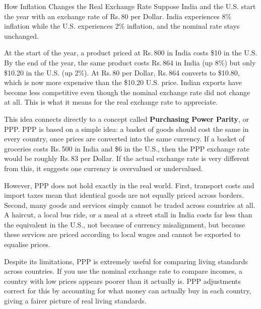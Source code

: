 \documentclass[12pt,a4paper]{article}
\begin{document}
\begin{workedexample}{How Inflation Changes the Real Exchange Rate}
Suppose India and the U.S. start the year with an exchange rate of Rs.\,80 per Dollar. India experiences 8\% inflation while the U.S. experiences 2\% inflation, and the nominal rate stays unchanged.

\medskip
At the start of the year, a product priced at Rs.\,800 in India costs \$10 in the U.S. By the end of the year, the same product costs Rs.\,864 in India (up 8\%) but only \$10.20 in the U.S. (up 2\%). At Rs.\,80 per Dollar, Rs.\,864 converts to \$10.80, which is now more expensive than the \$10.20 U.S. price. Indian exports have become less competitive even though the nominal exchange rate did not change at all. This is what it means for the real exchange rate to appreciate.
\end{workedexample}

This idea connects directly to a concept called \textbf{Purchasing Power Parity}, or PPP. PPP is based on a simple idea: a basket of goods should cost the same in every country, once prices are converted into the same currency. If a basket of groceries costs Rs.\,500 in India and \$6 in the U.S., then the PPP exchange rate would be roughly Rs.\,83 per Dollar. If the actual exchange rate is very different from this, it suggests one currency is overvalued or undervalued.

However, PPP does not hold exactly in the real world. First, transport costs and import taxes mean that identical goods are not equally priced across borders. Second, many goods and services simply cannot be traded across countries at all. A haircut, a local bus ride, or a meal at a street stall in India costs far less than the equivalent in the U.S., not because of currency misalignment, but because these services are priced according to local wages and cannot be exported to equalise prices.

Despite its limitations, PPP is extremely useful for comparing living standards across countries. If you use the nominal exchange rate to compare incomes, a country with low prices appears poorer than it actually is. PPP adjustments correct for this by accounting for what money can actually buy in each country, giving a fairer picture of real living standards.
\end{document}

